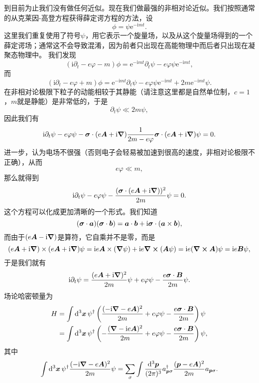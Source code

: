 \documentclass[hyperref, UTF8, a4paper]{ctexart}
\newcommand*{\ii}{\mathrm{i}}
\newcommand*{\ee}{\mathrm{e}}
\begin{document}
到目前为止我们没有做任何近似。现在我们做最强的非相对论近似。我们按照通常的从克莱因-高登方程获得薛定谔方程的方法，设
\[
    \phi = \psi \ee^{-\ii m t}.
\]
这里我们重复使用了符号$\psi$，用它表示一个旋量场，以及从这个旋量场得到的一个薛定谔场；通常这不会导致混淆，因为前者只出现在高能物理中而后者只出现在凝聚态物理中。
我们发现
\[
    (\ii \partial_t - e \varphi - m) \phi = \ee^{-\ii m t} \partial_t \psi - e \varphi \psi \ee^{-\ii m t},
\]
而
\[
    (\ii \partial_t - e \varphi + m) \phi = \ee^{-\ii m t} \partial_t \psi - e \varphi \psi \ee^{-\ii m t} + 2 m \ee^{-\ii m t} \psi.
\]
在非相对论极限下粒子的动能相较于其静能（请注意这里都是自然单位制，$c=1$，$m$就是静能）是非常低的，于是
\[
    \partial_t \psi \ll 2m \psi,
\]
因此我们有
\[
    \ii \partial_t \psi - e \varphi \psi - \vb*{\sigma} \cdot (e\vb*{A} + \ii \grad) \frac{1}{2m - e\varphi} \vb*{\sigma} \cdot (e\vb*{A} + \ii \grad) \psi = 0.
\]
进一步，认为电场不很强（否则电子会轻易被加速到很高的速度，非相对论极限不正确），从而
\[
    e \varphi \ll m,
\]
那么就得到
\begin{equation}
    \ii \partial_t \psi - e \varphi \psi - \frac{(\vb*{\sigma} \cdot (e\vb*{A} + \ii \grad))^2}{2m} \psi = 0.
\end{equation}
这个方程可以化成更加清晰的一个形式。我们知道
\[
    (\vb*{\sigma} \cdot \vb*{a}) (\vb*{\sigma} \cdot \vb*{b}) = \vb*{a} \cdot \vb*{b} + \ii \vb*{\sigma} \cdot (\vb*{a} \times \vb*{b}),
\]
而由于$(e\vb*{A} - \ii \grad)$是算符，它自乘并不是零，而是
\[
    (e\vb*{A} + \ii \grad) \times (e\vb*{A} + \ii \grad) \psi = \ii e \vb*{A} \times (\grad{\psi}) + \ii e \curl{(\vb*{A} \psi)} = \ii e  (\curl{\vb*{A}}) \psi = \ii e \vb*{B} \psi,
\]
于是我们就有
\begin{equation}
    \ii \partial_t \psi = \frac{(e \vb*{A} + \ii \grad)^2}{2m} \psi + e \varphi \psi - \frac{e \vb*{\sigma} \cdot \vb*{B}}{2m} \psi.
\end{equation}
场论哈密顿量为
\begin{equation}
    \begin{aligned}
        H &= \int \dd[3]{\vb*{x}} \psi^\dagger \left( \frac{(- \ii \grad - e \vb*{A})^2}{2m} + e \varphi \psi - \frac{e \vb*{\sigma} \cdot \vb*{B}}{2m} \right) \psi \\
        &= \int \dd[3]{\vb*{x}} \psi^\dagger \left( - \frac{(\grad - \ii e \vb*{A})^2}{2m} + e \varphi \psi - \frac{e \vb*{\sigma} \cdot \vb*{B}}{2m} \right) \psi ,
    \end{aligned}
    \label{eq:minimal-coupling}
\end{equation}
其中
\begin{equation}
    \int \dd[3]{\vb*{x}} \psi^\dagger \frac{(- \ii \grad - e \vb*{A})^2}{2m} \psi = \sum_\sigma \int \frac{\dd[3]{\vb*{p}}}{(2\pi)^3} a^\dagger_{\vb*{p} \sigma} \frac{(\vb*{p} - e \vb*{A})^2}{2m} a_{\vb*{p} \sigma}.
\end{equation}
\end{document}

